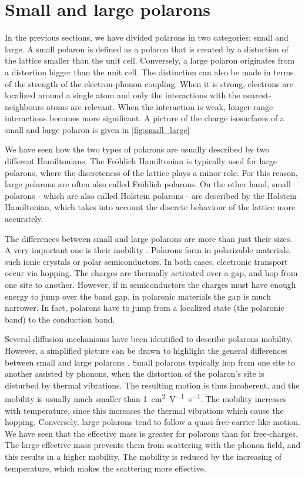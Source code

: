 \section{Small and large polarons}
In the previous sections, we have divided polarons in two categories: small and large. A small polaron is defined as a polaron that is created by a distortion of the lattice smaller than the unit cell. Conversely, a large polaron originates from a distortion bigger than the unit cell. The distinction can also be made in terms of the strength of the electron-phonon coupling. When it is strong, electrons are localized around a single atom and only the interactions with the nearest-neighbours atoms are relevant. When the interaction is weak, longer-range interactions becomes more significant. A picture of the charge isosurfaces of a small and large polaron is given in \cref{fig:small_large}

We have seen how the two types of polarons are usually described by two different Hamiltonians. The Fröhlich Hamiltonian is typically used for large polarons, where the discreteness of the lattice plays a minor role. For this reason, large polarons are often also called Fröhlich polarons. On the other hand, small polarons - which are also called Holstein polarons - are described by the Holstein Hamiltonian, which takes into account the discrete behaviour of the lattice more accurately.

The differences between small and large polarons are more than just their sizes. A very important one is their mobility \cite{natanzon2020}. Polarons form in polarizable materials, such ionic crystals or polar semiconductors. In both cases, electronic transport occur via hopping. The charges are thermally activated over a gap, and hop from one site to another. However, if in semiconductors the charges must have enough energy to jump over the band gap, in polaronic materials the gap is much narrower. In fact, polarons have to jump from a localized state (the polaronic band) to the conduction band.

Several diffusion mechanisms have been identified to describe polarons mobility. However, a simplified picture can be drawn to highlight the general differences between small and large polarons \cite{franchini2021b}. Small polarons typically hop from one site to another assisted by phonons, when the distortion of the polaron's site is disturbed by thermal vibrations. The resulting motion is thus incoherent, and the mobility is usually much smaller than \SI{1}{cm^2 V^{-1}s^{-1}}. The mobility increases with temperature, since this increases the thermal vibrations which cause the hopping. Conversely, large polarons tend to follow a quasi-free-carrier-like motion. We have seen that the effective mass is greater for polarons than for free-charges. The large effective mass prevents them from scattering with the phonon field, and this results in a higher mobility. The mobility is reduced by the increasing of temperature, which makes the scattering more effective.

